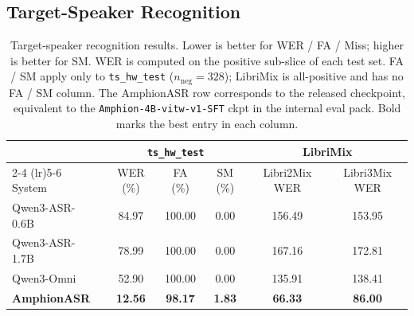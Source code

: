\subsection{Target-Speaker Recognition}
\label{sec:tsasr}

\begin{table}[t]
  \caption{Target-speaker recognition results. Lower is better
    for WER / FA / Miss; higher is better for SM. WER is computed
    on the positive sub-slice of each test set. FA / SM apply only
    to \texttt{ts\_hw\_test} ($n_\text{neg} = 328$); LibriMix is
    all-positive and has no FA / SM column. The AmphionASR row
    corresponds to the released checkpoint, equivalent to the
    \texttt{Amphion-4B-vitw-v1-SFT} ckpt in the internal eval
    pack. Bold marks the best entry in each column.}
  \label{tab:tsasr}
  \centering
  \small
  \setlength{\tabcolsep}{4.5pt}
  \begin{tabular}{lccccc}
    \toprule
    & \multicolumn{3}{c}{\texttt{ts\_hw\_test}} & \multicolumn{2}{c}{LibriMix} \\
    \cmidrule(lr){2-4} \cmidrule(lr){5-6}
    System & WER (\%) & FA (\%) & SM (\%) & Libri2Mix WER & Libri3Mix WER \\
    \midrule
    Qwen3-ASR-0.6B~\cite{qwen2025qwen3asr} & 84.97          & 100.00          & 0.00          & 156.49          & 153.95          \\
    Qwen3-ASR-1.7B~\cite{qwen2025qwen3asr} & 78.99          & 100.00          & 0.00          & 167.16          & 172.81          \\
    Qwen3-Omni~\cite{xu2025qwen25omni}     & 52.90          & 100.00          & 0.00          & 135.91          & 138.41          \\
    \midrule
    \textbf{AmphionASR}                    & \textbf{12.56} & \textbf{98.17}  & \textbf{1.83} & \textbf{66.33}  & \textbf{86.00}  \\
    \bottomrule
  \end{tabular}
\end{table}

